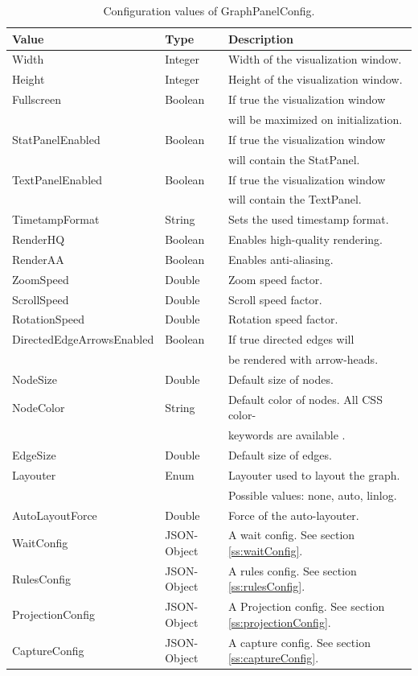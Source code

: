 \begin{table}[h]
\caption{Configuration values of GraphPanelConfig.}
\centering
\begin{tabular}[h]{|l|l|l|}\hline
	\textbf{Value} & \textbf{Type} & \textbf{Description}\\
	\hline
	Width & Integer & Width of the visualization window.\\
	\hline
	Height & Integer & Height of the visualization window.\\
	\hline
	Fullscreen & Boolean & If true the visualization window\\
	& & will be maximized on initialization.\\
	\hline
	StatPanelEnabled & Boolean & If true the visualization window\\
	& & will contain the StatPanel.\\
	\hline
	TextPanelEnabled & Boolean & If true the visualization window\\
	& & will contain the TextPanel.\\
	\hline
	TimetampFormat & String & Sets the used timestamp format.\\
	\hline
	RenderHQ & Boolean & Enables high-quality rendering.\\
	\hline
	RenderAA & Boolean & Enables anti-aliasing.\\
	\hline
	ZoomSpeed & Double & Zoom speed factor.\\
	\hline
	ScrollSpeed & Double & Scroll speed factor.\\
	\hline
	RotationSpeed & Double & Rotation speed factor.\\
	\hline
	DirectedEdgeArrowsEnabled & Boolean & If true directed edges will\\
	& & be rendered with arrow-heads.\\
	\hline
	NodeSize & Double & Default size of nodes.\\
	\hline
	NodeColor & String & Default color of nodes. All CSS color-\\
	& & keywords are available \cite{css-colors}.\\
	\hline
	EdgeSize & Double & Default size of edges.\\
	\hline
	Layouter & Enum & Layouter used to layout the graph.\\
	& & Possible values: none, auto, linlog.\\
	\hline
	AutoLayoutForce & Double & Force of the auto-layouter.\\
	\hline
	WaitConfig & JSON-Object & A wait config. See section \ref{ss:waitConfig}.\\
	\hline
	RulesConfig & JSON-Object & A rules config. See section \ref{ss:rulesConfig}.\\
	\hline
	ProjectionConfig & JSON-Object & A Projection config. See section \ref{ss:projectionConfig}.\\
	\hline
	CaptureConfig & JSON-Object & A capture config. See section \ref{ss:captureConfig}.\\
	\hline
\end{tabular}
\label{tab:graphPanelConfigValues}
\end{table}

